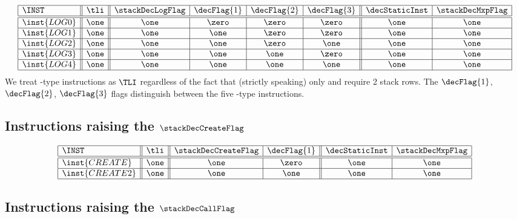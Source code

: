 \[
\begin{array}{|l||c||c|c|c|c||c|c|}
	\hline
	\INST			& \tli	& \stackDecLogFlag	& \decFlag{1}	& \decFlag{2}	& \decFlag{3}	& \decStaticInst	& \stackDecMxpFlag	\\ \hline\hline
	\inst{LOG0}		& \one	& \one			& \zero			& \zero			& \zero			& \one				& \one			\\ \hline
	\inst{LOG1}		& \one	& \one			& \one			& \zero			& \zero			& \one				& \one			\\ \hline
	\inst{LOG2}		& \one	& \one			& \one			& \zero			& \one			& \one				& \one			\\ \hline
	\inst{LOG3}		& \one	& \one			& \one			& \one			& \zero			& \one				& \one			\\ \hline
	\inst{LOG4}		& \one	& \one			& \one			& \one			& \one			& \one				& \one			\\ \hline
\end{array}
\]
We treat -type instructions as $\TLI$ regardless of the fact that (strictly speaking) only  and  require 2 stack rows. The $\decFlag{1}$, $\decFlag{2}$, $\decFlag{3}$ flags distinguish between the five -type instructions.

\subsection{Instructions raising the $\stackDecCreateFlag$}
\label{hub: instruction handling: Create}

\[
\begin{array}{|l||c||c|c||c|c|}
	\hline
	\INST			& \tli	& \stackDecCreateFlag 	& \decFlag{1}	& \decStaticInst	& \stackDecMxpFlag	\\ \hline\hline
	\inst{CREATE}	& \one	& \one				& \zero			& \one				& \one			\\ \hline
	\inst{CREATE2}	& \one	& \one				& \one			& \one				& \one			\\ \hline
\end{array}
\]

\subsection{Instructions raising the $\stackDecCallFlag$}
\label{hub: instruction handling: Call}

